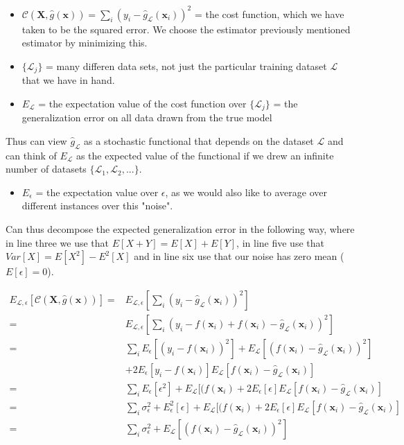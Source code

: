 \documentclass[norsk,a4paper,11pt]{article}
\begin{document}
\begin{itemize}
\begin{itemize}
			\item $\mathcal{C}(\mathbf{X}, \hat{g}(\mathbf{x})) = \sum_i (y_i - \hat{g}_\mathcal{L}(\mathbf{x}_i))^2 $ = the cost function, which we have taken to be the squared error. We choose the estimator previously mentioned estimator by minimizing this.
			\item $\{ \mathcal{L}_j \}$ = many differen data sets, not just the particular training dataset $\mathcal{L}$ that we have in hand.
			\item $E_\mathcal{L}$ = the expectation value of the cost function over $\{ \mathcal{L}_j \}$ = the generalization error on all data drawn from the true model
		\end{itemize}
		Thus can view $\hat{g}_\mathcal{L}$ as a stochastic functional that depends on the dataset $\mathcal{L}$ and can think of $E_\mathcal{L}$ as the expected value of the functional if we drew an infinite number of datasets $\{ \mathcal{L}_1, \mathcal{L}_2,... \}$.
		\begin{itemize}
			\item $E_\epsilon$ = the expectation value over $\epsilon$, as we would also like to average over different instances over this "noise". 
		\end{itemize} 
		Can thus decompose the expected generalization error in the following way, where in line three we use that $E[X + Y] = E[X] + E[Y]$, in line five use that $Var[X] = E[X^2] - E^2[X]$ and in line six use that our noise has zero mean ($E[\epsilon] = 0$).
	\end{itemize}
	{\tiny
	\begin{align}
		E_{\mathcal{L}, \epsilon} [ \mathcal{C} (\mathbf{X}, \hat{g}(\mathbf{x})) ] 
		=& E_{\mathcal{L}, \epsilon} [\sum_i (y_i - \hat{g}_\mathcal{L}(\mathbf{x}_i))^2] \\ 
		=& E_{\mathcal{L}, \epsilon} [\sum_i (y_i -f(\mathbf{x}_i) + f(\mathbf{x}_i) - \hat{g}_\mathcal{L}(\mathbf{x}_i))^2] \\
		=& \sum_i E_\epsilon [(y_i - f(\mathbf{x}_i))^2] + E_\mathcal{L} [(f(\mathbf{x}_i) - \hat{g}_\mathcal{L}(\mathbf{x}_i) )^2] \nonumber \\ 
		& + 2E_\epsilon[y_i - f(\mathbf{x}_i)] E_\mathcal{L}[f(\mathbf{x}_i) - \hat{g}_\mathcal{L}(\mathbf{x}_i)] \\
		=& \sum_i E_\epsilon [\epsilon^2] + E_\mathcal{L} [(f(\mathbf{x}_i) +2E_\epsilon[\epsilon] E_\mathcal{L}[f(\mathbf{x}_i) - \hat{g}_\mathcal{L}(\mathbf{x}_i)] \\
		=& \sum_i \sigma_\epsilon^2 + E_\epsilon^2 [\epsilon] + E_\mathcal{L} [(f(\mathbf{x}_i) +2E_\epsilon[\epsilon] E_\mathcal{L}[f(\mathbf{x}_i) - \hat{g}_\mathcal{L}(\mathbf{x}_i)] \\
		=& \sum_i \sigma_\epsilon^2 + E_\mathcal{L} [(f(\mathbf{x}_i) - \hat{g}_\mathcal{L}(\mathbf{x}_i))^2]
	\end{align}} 
\end{document}
